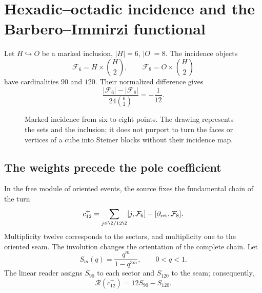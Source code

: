 \section{Hexadic--octadic incidence and the Barbero--Immirzi functional}
\label{v:ant:sec:barbero}
Let $H\hookrightarrow O$ be a marked inclusion, $|H|=6$, $|O|=8$.
The incidence objects
\[
\mathcal F_6=H\times\binom H2,\qquad
\mathcal F_8=O\times\binom H2
\]
have cardinalities $90$ and $120$. Their normalized difference gives
\[
\frac{|\mathcal F_6|-|\mathcal F_8|}{24\binom62}=-\frac1{12}.
\]
\begin{figure}[htbp]
\centering
{}
\caption{Marked incidence from six to eight points. The drawing represents
the sets and the inclusion; it does not purport to turn the faces or vertices
of a cube into Steiner blocks without their incidence map.}
\end{figure}

\subsection{The weights precede the pole coefficient}
In the free module of oriented events, the source fixes the
fundamental chain of the turn
\[
c_{12}^{+}=
\sum_{j\in\Z/12\Z}[j,\mathcal F_6]
-[\partial_{\rm ret},\mathcal F_8].
\]
Multiplicity twelve corresponds to the sectors, and multiplicity one
to the oriented seam. The involution changes the orientation of the complete
chain. Let
\[
S_m(q)=\frac{q^m}{1-q^{3m}},\qquad 0<q<1.
\]
The linear reader assigns $S_{90}$ to each sector and $S_{120}$ to the seam;
consequently,
\[
\mathscr R(c_{12}^{+})=12S_{90}-S_{120}.
\]

